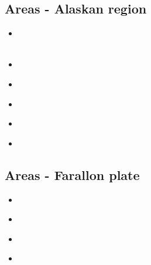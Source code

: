 \subsection{Areas - Alaskan region} 

\begin{scriptsize}
\begin{itemize}
\item[\twothousandten] 
\textcite{kohp10} \\
\textcite{jabi10} \\
\item[\twothousandtwelve] 
\textcite{jabi12} \\
\item[\twothousandthirteen] 
\textcite{jabr13} \\

\item[\twothousandfifteen] 
\textcite{fifr15} \\

\item[\twothousandseventeen] 
\textcite{haja17} \\
\item[\twothousandeighteen] 
\textcite{mimo18} \\
\end{itemize}
\end{scriptsize}

\subsection{Areas - Farallon plate} 

\begin{scriptsize}
\begin{itemize}
\item[\twothousandeight]
\textcite{lisg08} \\
\item[\twothousandeleven]
\textcite{list11} \\
\item[\twothousandtwelve]
\textcite{list12} \\
\item[\twothousandsixteen]
\textcite{licu16} \\
\end{itemize}
\end{scriptsize}

